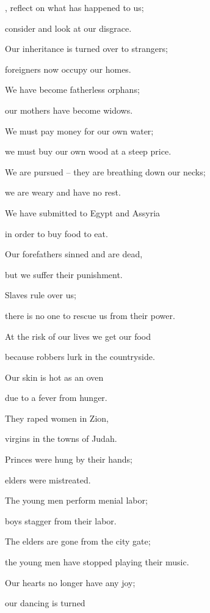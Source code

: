 {{}, reflect
on what
has happened
to us;
\par }{\Q consider
and look
at our disgrace.
\par }{\Q {}Our inheritance
is turned
over to strangers;
\par }{\Q foreigners
now occupy our homes.
\par }{\Q {}We have become
fatherless
orphans;
\par }{\Q our
mothers
have become widows.
\par }{\Q {}We must pay money
for our own water;
\par }{\Q we must buy
our own wood
at a steep price.
\par }{\Q {}We are pursued
– they are breathing down our necks;
\par }{\Q we are weary
and have no
rest.
\par }{\Q {}We have submitted
to Egypt and Assyria
\par }{\Q in order
to buy
food to eat.
\par }{\Q {}Our forefathers
sinned
and are dead,
\par }{\Q but we
suffer
their punishment.
\par }{\Q {}Slaves
rule
over us;
\par }{\Q there is no
one to rescue
us from their power.
\par }{\Q {}At the risk of our lives
we get
our food
\par }{\Q because robbers lurk
in the countryside.
\par }{\Q {}Our skin
is hot
as an oven
\par }{\Q due to
a fever
from hunger.
\par }{\Q {}They raped
women
in Zion,
\par }{\Q virgins
in the towns
of Judah.
\par }{\Q {}Princes
were hung
by their hands;
\par }{\Q elders
were mistreated.
\par }{\Q {}The young men
perform
menial labor;
\par }{\Q boys
stagger
from their labor.
\par }{\Q {}The elders
are gone from the city gate;
\par }{\Q the young men
have stopped
playing their music.
\par }{\Q {}Our hearts
no longer
have any joy;
\par }{\Q our dancing
is turned
}
